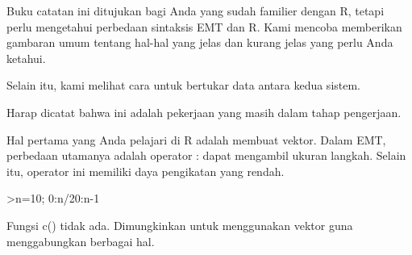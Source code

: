 \documentclass[a4paper,10pt]{article}
\begin{document}
\begin{eulernotebook}
\begin{eulercomment}
Buku catatan ini ditujukan bagi Anda yang sudah familier dengan R,
tetapi perlu mengetahui perbedaan sintaksis EMT dan R. Kami mencoba
memberikan gambaran umum tentang hal-hal yang jelas dan kurang jelas
yang perlu Anda ketahui.

Selain itu, kami melihat cara untuk bertukar data antara kedua sistem.
\end{eulercomment}
\begin{eulercomment}
Harap dicatat bahwa ini adalah pekerjaan yang masih dalam tahap
pengerjaan.
\end{eulercomment}
\begin{eulercomment}
Hal pertama yang Anda pelajari di R adalah membuat vektor. Dalam EMT,
perbedaan utamanya adalah operator : dapat mengambil ukuran langkah.
Selain itu, operator ini memiliki daya pengikatan yang rendah.
\end{eulercomment}
\begin{eulerprompt}
>n=10; 0:n/20:n-1
\end{eulerprompt}
\begin{euleroutput}
  [0,  0.5,  1,  1.5,  2,  2.5,  3,  3.5,  4,  4.5,  5,  5.5,  6,  6.5,
  7,  7.5,  8,  8.5,  9]
\end{euleroutput}
\begin{eulercomment}
Fungsi c() tidak ada. Dimungkinkan untuk menggunakan vektor guna
menggabungkan berbagai hal.


\end{eulercomment}
\end{eulernotebook}
\end{document}
